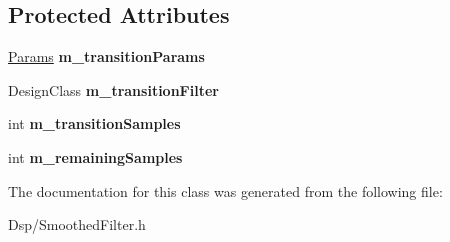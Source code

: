 \subsection*{Protected Attributes}
\begin{DoxyCompactItemize}
\item 
\hypertarget{classDsp_1_1SmoothedFilterDesign_ae49ccb2abc8b5a33685c133910cea993}{\hyperlink{structDsp_1_1Params}{Params} {\bfseries m\-\_\-transition\-Params}}\label{classDsp_1_1SmoothedFilterDesign_ae49ccb2abc8b5a33685c133910cea993}

\item 
\hypertarget{classDsp_1_1SmoothedFilterDesign_a200648526b04d50a9471ec195c0b4d9b}{Design\-Class {\bfseries m\-\_\-transition\-Filter}}\label{classDsp_1_1SmoothedFilterDesign_a200648526b04d50a9471ec195c0b4d9b}

\item 
\hypertarget{classDsp_1_1SmoothedFilterDesign_a993c0e2751dd04fe759eb7af17769dd9}{int {\bfseries m\-\_\-transition\-Samples}}\label{classDsp_1_1SmoothedFilterDesign_a993c0e2751dd04fe759eb7af17769dd9}

\item 
\hypertarget{classDsp_1_1SmoothedFilterDesign_a59f2d87ba555cbdadce0ccbdd75dd616}{int {\bfseries m\-\_\-remaining\-Samples}}\label{classDsp_1_1SmoothedFilterDesign_a59f2d87ba555cbdadce0ccbdd75dd616}

\end{DoxyCompactItemize}


The documentation for this class was generated from the following file\-:\begin{DoxyCompactItemize}
\item 
Dsp/Smoothed\-Filter.\-h\end{DoxyCompactItemize}
